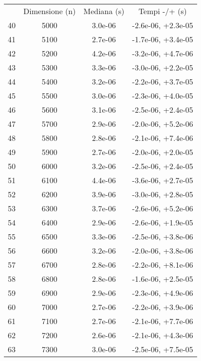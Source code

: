 \begin{table}
\centering
\begin{adjustbox}{width=1\textwidth/2}
\begin{tabular}{|c|c|c|c|}
\hline
 & Dimensione (n) & Mediana (s) & Tempi -/+ (s) \\
40 & 5000 & 3.0e-06 & -2.6e-06, +2.3e-05 \\
\cline{1-4}
41 & 5100 & 2.7e-06 & -1.7e-06, +3.4e-05 \\
\cline{1-4}
42 & 5200 & 4.2e-06 & -3.2e-06, +4.7e-06 \\
\cline{1-4}
43 & 5300 & 3.3e-06 & -3.0e-06, +2.2e-05 \\
\cline{1-4}
44 & 5400 & 3.2e-06 & -2.2e-06, +3.7e-05 \\
\cline{1-4}
45 & 5500 & 3.0e-06 & -2.3e-06, +4.0e-05 \\
\cline{1-4}
46 & 5600 & 3.1e-06 & -2.5e-06, +2.4e-05 \\
\cline{1-4}
47 & 5700 & 2.9e-06 & -2.0e-06, +5.2e-06 \\
\cline{1-4}
48 & 5800 & 2.8e-06 & -2.1e-06, +7.4e-06 \\
\cline{1-4}
49 & 5900 & 2.7e-06 & -2.0e-06, +2.0e-05 \\
\cline{1-4}
50 & 6000 & 3.2e-06 & -2.5e-06, +2.4e-05 \\
\cline{1-4}
51 & 6100 & 4.4e-06 & -3.6e-06, +2.7e-05 \\
\cline{1-4}
52 & 6200 & 3.9e-06 & -3.0e-06, +2.8e-05 \\
\cline{1-4}
53 & 6300 & 3.7e-06 & -2.6e-06, +5.2e-06 \\
\cline{1-4}
54 & 6400 & 2.9e-06 & -2.6e-06, +1.9e-05 \\
\cline{1-4}
55 & 6500 & 3.3e-06 & -2.5e-06, +3.8e-06 \\
\cline{1-4}
56 & 6600 & 3.2e-06 & -2.0e-06, +3.8e-06 \\
\cline{1-4}
57 & 6700 & 2.8e-06 & -2.2e-06, +8.1e-06 \\
\cline{1-4}
58 & 6800 & 2.8e-06 & -1.6e-06, +2.5e-05 \\
\cline{1-4}
59 & 6900 & 2.9e-06 & -2.3e-06, +4.9e-06 \\
\cline{1-4}
60 & 7000 & 2.7e-06 & -2.2e-06, +3.9e-06 \\
\cline{1-4}
61 & 7100 & 2.7e-06 & -2.1e-06, +7.7e-06 \\
\cline{1-4}
62 & 7200 & 2.6e-06 & -2.1e-06, +4.3e-06 \\
\cline{1-4}
63 & 7300 & 3.0e-06 & -2.5e-06, +7.5e-05 \\

\end{tabular}
\end{adjustbox}
\end{table}

